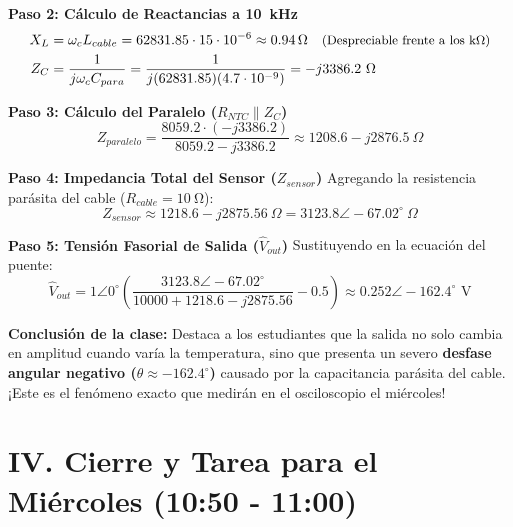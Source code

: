 \documentclass[11pt,a4paper]{article}
\begin{document}
\noindent \textbf{Paso 2: Cálculo de Reactancias a \qty{10}{\kilo\hertz}}
\begin{align*}
    X_L &= \omega_c L_{cable} = 62831.85 \cdot 15 \cdot 10^{-6} \approx \qty{0.94}{\ohm} \quad \text{\small(Despreciable frente a los k$\Omega$)} \\
    Z_C &= \frac{1}{j\omega_c C_{para}} = \frac{1}{j(62831.85)(4.7 \cdot 10^{-9})} = -j 3386.2\ \Omega
\end{align*}

\noindent \textbf{Paso 3: Cálculo del Paralelo ($R_{NTC} \parallel Z_C$)}
\begin{equation*}
    Z_{paralelo} = \frac{8059.2 \cdot (-j 3386.2)}{8059.2 - j 3386.2} \approx 1208.6 - j 2876.5\ \Omega
\end{equation*}

\noindent \textbf{Paso 4: Impedancia Total del Sensor ($Z_{sensor}$)}
Agregando la resistencia parásita del cable ($R_{cable} = \qty{10}{\ohm}$):
\begin{equation*}
    Z_{sensor} \approx 1218.6 - j 2875.56\ \Omega = 3123.8 \angle -67.02^\circ\ \Omega
\end{equation*}

\noindent \textbf{Paso 5: Tensión Fasorial de Salida ($\hat{V}_{out}$)}
Sustituyendo en la ecuación del puente:
\begin{equation*}
    \hat{V}_{out} = 1 \angle 0^\circ \left( \frac{3123.8 \angle -67.02^\circ}{10000 + 1218.6 - j 2875.56} - 0.5 \right) \approx 0.252 \angle -162.4^\circ\text{ V}
\end{equation*}

\begin{justificacion}
\textbf{Conclusión de la clase:} Destaca a los estudiantes que la salida no solo cambia en amplitud cuando varía la temperatura, sino que presenta un severo \textbf{desfase angular negativo ($\theta \approx -162.4^\circ$)} causado por la capacitancia parásita del cable. ¡Este es el fenómeno exacto que medirán en el osciloscopio el miércoles!
\end{justificacion}

\section*{IV. Cierre y Tarea para el Miércoles (10:50 - 11:00)}
\end{document}
